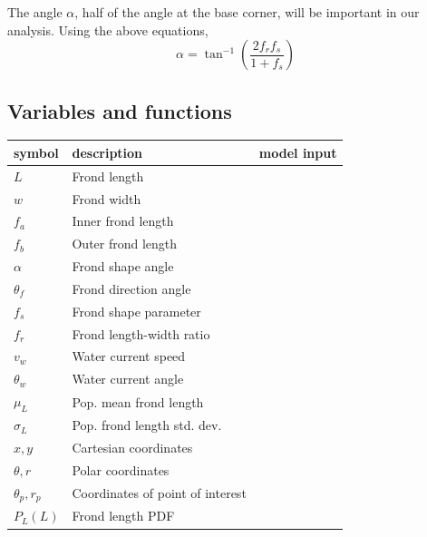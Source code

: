 \documentclass[10pt]{article}
\newenvironment{mcfig}
	{\par\medskip\noindent\minipage{\linewidth}}
	{\endminipage\par\medskip}
\begin{document}
\begin{multicols}{2}
The angle $\alpha$, half of the angle at the base corner, will be important in our analysis.
Using the above equations,
\begin{equation}
	\alpha = \tan^{-1}\left(\frac{2f_rf_s}{1+f_s}\right)
\end{equation}

\subsection{Variables and functions}
\begin{mcfig}
	\centering
	\begin{tabular}{@{}llc@{}} \toprule
		symbol                    & description                         & model input \\ \midrule
		$L$                       & Frond length                        & \\
		$w$                       & Frond width                         & \\
		$f_a$                     & Inner frond length                  & \\
		$f_b$                     & Outer frond length                  & \\
		$\alpha$                  & Frond shape angle                   & \\
		$\theta_f$                & Frond direction angle               & \\
		$f_s$                     & Frond shape parameter               & \checkmark \\
		$f_r$                     & Frond length-width ratio            & \checkmark \\
		$v_w$                     & Water current speed                 & \checkmark \\
		$\theta_w$                & Water current angle                 & \checkmark \\
		$\mu_L$                   & Pop. mean frond length              & \checkmark \\
		$\sigma_L$                & Pop. frond length std. dev.         & \checkmark \\
		$x,y$                     & Cartesian coordinates               & \\
		$\theta,r$                & Polar coordinates                   & \\
		$\theta_p,r_p$            & Coordinates of point of interest    & \\
		$P_L(L)$                  & Frond length PDF                    & \\

\end{tabular}
\end{mcfig}
\end{multicols}
\end{document}
